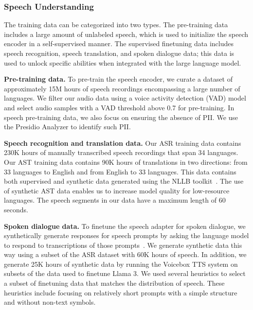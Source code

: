 \subsubsection{Speech Understanding}

The training data can be categorized into two types.
The pre-training data includes a large amount of unlabeled speech, which is used to initialize the speech encoder in a self-supervised manner.
The supervised finetuning data includes speech recognition, speech translation, and spoken dialogue data; this data is used to unlock specific abilities when integrated with the large language model.

\textbf{Pre-training data.}
To pre-train the speech encoder, we curate a dataset of approximately 15M hours of speech recordings encompassing a large number of languages.
We filter our audio data using a voice activity detection (VAD) model and select audio samples with a VAD threshold above 0.7 for pre-training.
In speech pre-training data, we also focus on ensuring the absence of PII. We use the Presidio Analyzer to identify such PII. %

\textbf{Speech recognition and translation data.}
Our ASR training data contains 230K hours of manually transcribed speech recordings that span 34 languages.
Our AST training data contains 90K hours of translations in two directions: from 33 languages to English and from English to 33 languages.
This data contains both supervised and synthetic data generated using the NLLB toolkit~\citep{nllb2022}.
The use of synthetic AST data enables us to increase model quality for low-resource languages.
The speech segments in our data have a maximum length of 60 seconds.


\textbf{Spoken dialogue data.}
To finetune the speech adapter for spoken dialogue, we synthetically generate responses for speech prompts by asking the language model to respond to transcriptions of those prompts~\citep{fathullah2024audiochatllama}.
We generate synthetic data this way using a subset of the ASR dataset with 60K hours of speech.
In addition, we generate 25K hours of synthetic data by running the Voicebox TTS system \citep{le2024voicebox} on subsets of the data used to finetune Llama 3.
We used several heuristics to select a subset of finetuning data that matches the distribution of speech.
These heuristics include focusing on relatively short prompts with a simple structure and without non-text symbols.

